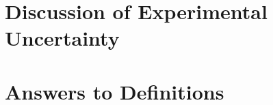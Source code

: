 \documentclass{article}
\begin{document}

\section{Discussion of Experimental Uncertainty}

%


\section{Answers to Definitions}
%
\end{document}
